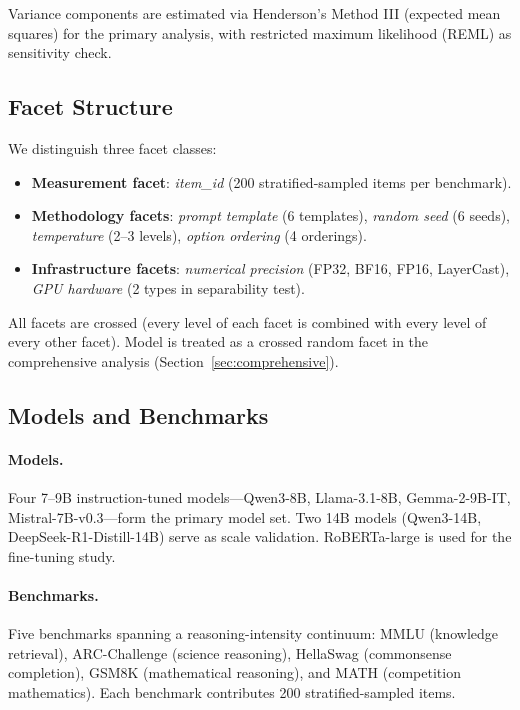 \documentclass[11pt]{article}
\begin{document}
Variance components are estimated via Henderson's Method III (expected mean squares) for the primary analysis, with restricted maximum likelihood (REML) as sensitivity check.

\subsection{Facet Structure}

We distinguish three facet classes:
\begin{itemize}
\item \textbf{Measurement facet}: \textit{item\_id} (200 stratified-sampled items per benchmark).
\item \textbf{Methodology facets}: \textit{prompt template} (6 templates), \textit{random seed} (6 seeds), \textit{temperature} (2--3 levels), \textit{option ordering} (4 orderings).
\item \textbf{Infrastructure facets}: \textit{numerical precision} (FP32, BF16, FP16, LayerCast), \textit{GPU hardware} (2 types in separability test).
\end{itemize}

All facets are crossed (every level of each facet is combined with every level of every other facet). Model is treated as a crossed random facet in the comprehensive analysis (Section~\ref{sec:comprehensive}).

\subsection{Models and Benchmarks}

\paragraph{Models.} Four 7--9B instruction-tuned models---Qwen3-8B, Llama-3.1-8B, Gemma-2-9B-IT, Mistral-7B-v0.3---form the primary model set. Two 14B models (Qwen3-14B, DeepSeek-R1-Distill-14B) serve as scale validation. RoBERTa-large is used for the fine-tuning study.

\paragraph{Benchmarks.} Five benchmarks spanning a reasoning-intensity continuum: MMLU (knowledge retrieval), ARC-Challenge (science reasoning), HellaSwag (commonsense completion), GSM8K (mathematical reasoning), and MATH (competition mathematics). Each benchmark contributes 200 stratified-sampled items.
\end{document}
